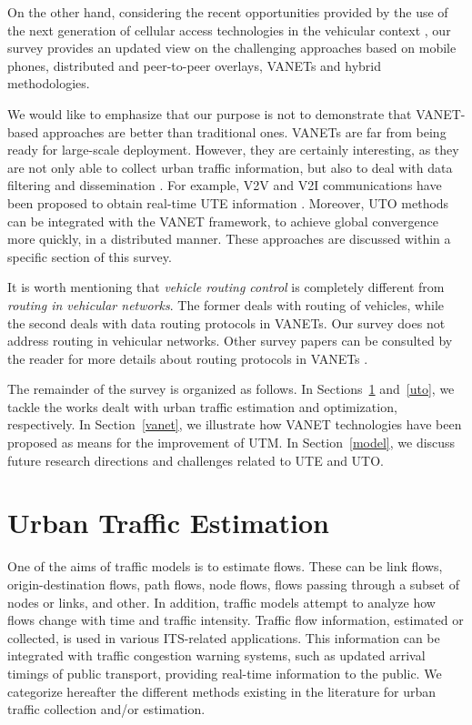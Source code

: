 \documentclass[10pt,onecolumn]{article}
\begin{document}
On the other hand, considering the recent opportunities provided by the use of the next generation of cellular access technologies in the vehicular context \cite{AranitiLTEVehicular}, our survey provides an updated view on the challenging approaches based on mobile phones, distributed and peer-to-peer overlays, VANETs and hybrid methodologies.

We would like to emphasize that our purpose is not to demonstrate that VANET-based approaches are better than traditional ones. VANETs are far from being ready for large-scale deployment. However, they are certainly interesting, as they are not only able to collect urban traffic information, but also to deal with data filtering and dissemination \cite{Killat2007}. For example, V2V and V2I communications have been proposed to obtain real-time UTE information \cite{Nadeem2004, Chen2006, Jerbi2007, Panichpapiboon2008, Garelli2011, Ma2009}. 
Moreover, UTO methods can be integrated with the VANET framework, to achieve global convergence more quickly, in a distributed manner. These approaches are discussed within a specific section of this survey.

It is worth mentioning that \emph{vehicle routing control} is completely different from \emph{routing in vehicular networks}. The former deals with routing of vehicles, while the second deals with data routing protocols in VANETs. Our survey does not address routing in vehicular networks. Other survey papers can be consulted by the reader for more details about routing protocols in VANETs \cite{lee2009survey} \cite{Chen2009}.

The remainder of the survey is organized as follows. In Sections~\ref{ute} and~\ref{uto}, we tackle the works dealt with urban traffic estimation and optimization, respectively.
In Section~\ref{vanet}, we illustrate how VANET technologies have been proposed as means for the improvement of UTM. 
In Section~\ref{model}, we discuss future research directions and challenges related to UTE and UTO.



\section{Urban Traffic Estimation} 
\label{ute}

One of the aims of traffic models is to estimate flows. These can be link flows, origin-destination flows, path flows, node flows, flows passing through a subset of nodes or links, and other. 
In addition, traffic models attempt to analyze how flows change with time and traffic intensity. Traffic flow information, estimated or collected, is used in various ITS-related applications.
This information can be integrated with traffic congestion warning systems, such as updated arrival timings of public transport, providing real-time information to the public. 
We categorize hereafter the different methods existing in the literature for urban traffic collection and/or estimation. 
\end{document}
